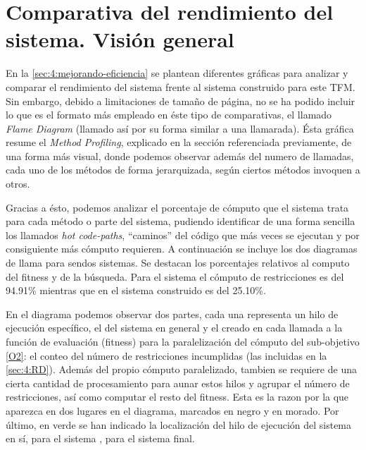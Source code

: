 \section{Comparativa del rendimiento del sistema. Visión general} \label{Anexo:flame-diagram}

En la \autoref{sec:4:mejorando-eficiencia} se plantean diferentes gráficas para analizar y comparar el rendimiento del sistema \legacy{} frente al sistema construido para este TFM. Sin embargo, debido a limitaciones de tamaño de página, no se ha podido incluir lo que es el formato más empleado en éste tipo de comparativas, el llamado \textit{Flame Diagram} (llamado así por su forma similar a una llamarada). Ésta gráfica resume el \textit{Method Profiling}, explicado en la sección referenciada previamente, de una forma más visual, donde podemos observar además del numero de llamadas, cada uno de los métodos de forma jerarquizada, según ciertos métodos invoquen a otros.

Gracias a ésto, podemos analizar el porcentaje de cómputo que el sistema trata para cada método o parte del sistema, pudiendo identificar de una forma sencilla los llamados \textit{hot code-paths}, ``caminos'' del código que más veces se ejecutan y por consiguiente más cómputo requieren. A continuación se incluye los dos diagramas de llama para sendos sistemas. Se destacan los porcentajes relativos al computo del fitness y de la búsqueda. Para el sistema \legacy{} el cómputo de restricciones es del 94.91\% mientras que en el sistema construido es del 25.10\%.

En el diagrama podemos observar dos partes, cada una representa un hilo de ejecución específico, el del sistema en general y el creado en cada llamada a la función de evaluación (fitness) para la paralelización del cómputo del sub-objetivo \ref{O2}: el conteo del número de restricciones incumplidas (las incluidas en la \autoref{sec:4:RD}). Además del propio cómputo paralelizado, tambien se requiere de una cierta cantidad de procesamiento para aunar estos hilos y agrupar el número de restricciones, así como computar el resto del fitness. Esta es la razon por la que aparezca en dos lugares en el diagrama, marcados en negro y en morado.
Por último, en verde se han indicado la localización del hilo de ejecución del sistema en sí, \sa{} para el sistema \legacy{}, \vns{} para el sistema final.

